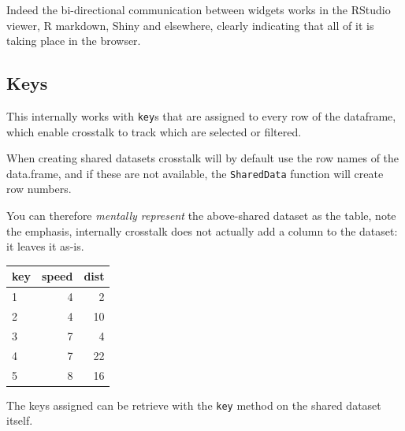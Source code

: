 \documentclass[10pt,]{krantz}
\makeatletter
\newenvironment{Shaded}{\begin{snugshade}}{\end{snugshade}}
\newcommand{\CommentTok}[1]{\textcolor[rgb]{0.37,0.37,0.37}{\textit{#1}}}
\newcommand{\DecValTok}[1]{\textcolor[rgb]{0.06,0.06,0.06}{#1}}
\newcommand{\KeywordTok}[1]{\textcolor[rgb]{0.27,0.27,0.27}{\textbf{#1}}}
\newcommand{\NormalTok}[1]{#1}
\newcommand{\OperatorTok}[1]{\textcolor[rgb]{0.43,0.43,0.43}{\textbf{#1}}}
\newcommand{\StringTok}[1]{\textcolor[rgb]{0.5,0.5,0.5}{#1}}
\newenvironment{kframe}{%
\medskip{}
\setlength{\fboxsep}{.8em}
 \def\at@end@of@kframe{}%
 \ifinner\ifhmode%
  \def\at@end@of@kframe{\end{minipage}}%
  \begin{minipage}{\columnwidth}%
 \fi\fi%
 \def\FrameCommand##1{\hskip\@totalleftmargin \hskip-\fboxsep
 \colorbox{shadecolor}{##1}\hskip-\fboxsep
     \hskip-\linewidth \hskip-\@totalleftmargin \hskip\columnwidth}%
 \MakeFramed {\advance\hsize-\width
   \@totalleftmargin\z@ \linewidth\hsize
   \@setminipage}}%
 {\par\unskip\endMakeFramed%
 \at@end@of@kframe}
\renewenvironment{Shaded}{\begin{kframe}}{\end{kframe}}
\makeatother
\begin{document}
Indeed the bi-directional communication between widgets works in the RStudio viewer, R markdown, Shiny and elsewhere, clearly indicating that all of it is taking place in the browser.

\hypertarget{linking-widgets-keys}{%
\subsection{Keys}\label{linking-widgets-keys}}

This internally works with \texttt{key}s that are assigned to every row of the dataframe, which enable crosstalk to track which are selected or filtered.

When creating shared datasets crosstalk will by default use the row names of the data.frame, and if these are not available, the \texttt{SharedData} function will create row numbers.

\begin{Shaded}
\end{Shaded}

You can therefore \emph{mentally represent} the above-shared dataset as the table, note the emphasis, internally crosstalk does not actually add a column to the dataset: it leaves it as-is.

\begin{tabular}{l|r|r}
\hline
key & speed & dist\\
\hline
1 & 4 & 2\\
\hline
2 & 4 & 10\\
\hline
3 & 7 & 4\\
\hline
4 & 7 & 22\\
\hline
5 & 8 & 16\\
\hline
\end{tabular}

The keys assigned can be retrieve with the \texttt{key} method on the shared dataset itself.

\begin{Shaded}
\end{Shaded}
\end{document}
